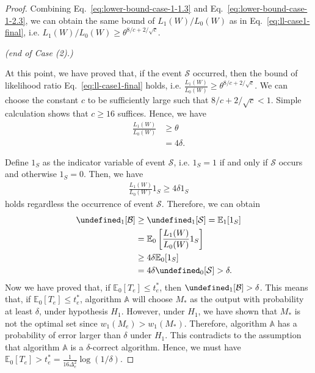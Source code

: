 \documentclass{article}
\newcommand{\E}{\mathbb E}
\let\Pr\undefined
\DeclareMathOperator{\Pr}{Pr}
\begin{document}
\begin{spacing}{1.1}
\begin{proof}
Combining Eq.~\eqref{eq:lower-bound-case-1-1.3} and Eq.~\eqref{eq:lower-bound-case-1-2.3}, we  can obtain the same bound of $L_1(W)/L_0(W)$ as in Eq.~\eqref{eq:ll-case1-final}, i.e. $L_1(W)/L_0(W) \ge \theta^{8/c+2/\sqrt{c}}$.

\emph{(end of Case (2).)}

At this point, we have proved that, if the event $\mathcal S$ occurred, then the bound of likelihood ratio Eq.~\eqref{eq:ll-case1-final} holds, i.e. $\frac{L_1(W)}{L_0(W)} \ge \theta^{8/c+2/\sqrt{c}}$.
We can choose the constant $c$ to be sufficiently large such that $8/c+2/\sqrt{c} < 1$.
Simple calculation shows that $c\ge 16$ suffices.
Hence, we have
\begin{align}
\frac{L_1(W)}{L_0(W)} &\ge \theta \nonumber \\
					  &= 4\delta.	
\end{align}


Define $1_S$ as the indicator variable of event $\mathcal S$, i.e. $1_S = 1$ if and only if $\mathcal S$ occurs and otherwise $1_S = 0$.
Then, we have
\begin{align*}
\frac{L_1(W)}{L_0(W)} 1_S \ge 4\delta 1_S
\end{align*}
holds regardless the occurrence of event $\mathcal S$.
Therefore, we can obtain
\begin{align*}
\Pr_1[\mathcal B] &\ge \Pr_1[\mathcal S] = \E_1[1_S] \\
				  &= \E_0\left[\frac{L_1(W)}{L_0(W)} 1_S\right] \\
				  &\ge 4\delta \E_0[1_S] \\
				  &= 4\delta \Pr_0[\mathcal S] > \delta.
\end{align*}
Now we have proved that, if $\E_0[T_e] \le t_e^*$, then $\Pr_1[\mathcal B]>\delta$.
This means that, if $\E_0[T_e] \le t_e^*$, algorithm $\mathbb A$ will choose $M_*$ as the output with probability at least $\delta$, under hypothesis $H_1$.
However, under $H_1$, we have shown that $M_*$ is not the optimal set since $w_1(M_e) > w_1(M_*)$.
Therefore, algorithm $\mathbb A$ has a probability of error larger than $\delta$ under $H_1$. 
This contradicts to the assumption that algorithm $\mathbb A$ is a $\delta$-correct algorithm.
Hence, we must have $\E_0[T_e] > t_e^* = \frac{1}{16\Delta_e^2}\log(1/\delta)$.

\end{proof}




\end{spacing}
\end{document}

